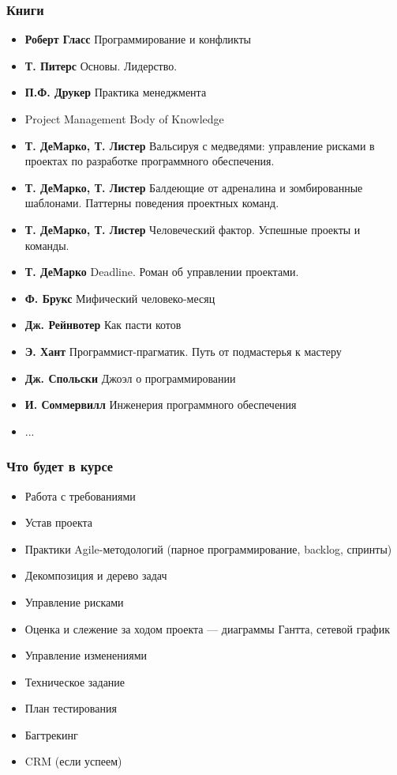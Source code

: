 \documentclass[xetex,mathserif,serif]{beamer}
\begin{document}
	\begin{frame}
		\frametitle{Книги}
		\begin{footnotesize}
			\begin{itemize}
				\item \textbf{Роберт Гласс} Программирование и конфликты
				\item \textbf{Т. Питерс} Основы. Лидерство.
				\item \textbf{П.Ф. Друкер} Практика менеджмента
				\item Project Management Body of Knowledge
				\item \textbf{Т. ДеМарко, Т. Листер} Вальсируя с медведями: управление рисками в проектах по разработке программного обеспечения.
				\item \textbf{Т. ДеМарко, Т. Листер} Балдеющие от адреналина и зомбированные шаблонами. Паттерны поведения проектных команд.
				\item \textbf{Т. ДеМарко, Т. Листер} Человеческий фактор. Успешные проекты и команды.
				\item \textbf{Т. ДеМарко} Deadline. Роман об управлении проектами.
				\item \textbf{Ф. Брукс} Мифический человеко-месяц
				\item \textbf{Дж. Рейнвотер} Как пасти котов
				\item \textbf{Э. Хант} Программист-прагматик. Путь от подмастерья к мастеру
				\item \textbf{Дж. Спольски} Джоэл о программировании
				\item \textbf{И. Соммервилл} Инженерия программного обеспечения
				\item ...
			\end{itemize}
		\end{footnotesize}
	\end{frame}

	\begin{frame}
		\frametitle{Что будет в курсе}
		\begin{footnotesize}
			\begin{itemize}
				\item Работа с требованиями
				\item Устав проекта
				\item Практики Agile-методологий (парное программирование, backlog, спринты)
				\item Декомпозиция и дерево задач
				\item Управление рисками
				\item Оценка и слежение за ходом проекта --- диаграммы Гантта, сетевой график
				\item Управление изменениями
				\item Техническое задание
				\item План тестирования
				\item Багтрекинг
				\item CRM (если успеем)
			\end{itemize}
		\end{footnotesize}
	\end{frame}
\end{document}
